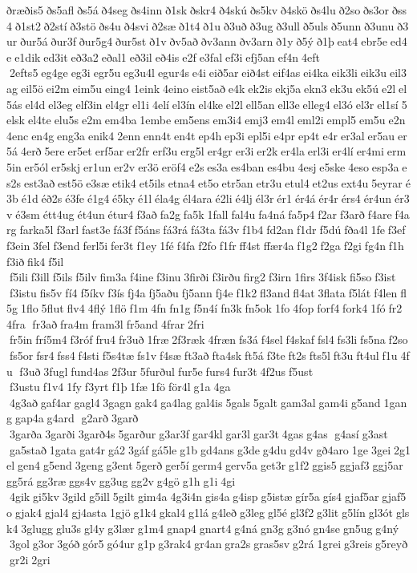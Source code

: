 ðræðis5 ðs5afl ðs5á ð4seg ðs4inn ð1sk ðskr4 ð4skú ðs5kv ð4skö ðs4lu ð2so ðs3or ðss4 ð1st2 ð2stí ð3stö ðs4u ð4svi ð2sæ ð1t4 ð1u ð3uð ð3ug ð3ull ð5uls ð5unn ð3unu ð3ur ður5á ður3f ður5g4 ður5st ð1v ðv5að ðv3ann ðv3arn ð1y ð5ý ð1þ eat4 ebr5e ed4e e1dik ed3it eð3a2 eðal1 eð3il eð4is e2f e3fal ef3i efj5an ef4n 4eft  2efts5 eg4ge eg3i egr5u eg3u4l egur4s e4i eið5ar eið4st eif4as ei4ka eik3li eik3u eil3ag eil5ö ei2m eim5u eing4 1eink 4eino eist5að e4k ek2is ekj5a ekn3 ek3u ek5ú e2l el5ás el4d el3eg elf3in el4gr el1i 4elí el3ín el4ke el2l ell5an ell3e elleg4 el3ó el3r el1sí 5elsk el4te elu5s e2m em4ba 1embe em5ens em3i4 emj3 em4l eml2i empl5 em5u e2n 4enc en4g eng3a enik4 2enn enn4t en4t ep4h ep3i epl5i e4pr ep4t e4r er3al er5au er5á 4erð 5ere er5et erf5ar er2fr erf3u erg5l er4gr er3i er2k er4la erl3i er4lí er4mi erm5in er5ól er5skj er1un er2v er3ö eröf4 e2s es3a es4ban es4bu 4esj e5ske 4eso esp3a es2s est3að est5ö e3sæ etik4 et5ils etna4 et5o etr5an etr3u etul4 et2us ext4u 5eyrar é3b é1d éð2s é3fe é1g4 é5ky é1l éla4g él4ara é2li é4lj él3r ér1 ér4á ér4r érs4 ér4un ér3v é3sm étt4ug ét4un étur4 f3að fa2g fa5k 1fall fal4u fa4ná fa5p4 f2ar f3arð f4are f4arg farka5l f3arl fast3e fá3f f5áns fá3rá fá3ta fá3v f1b4 fd2an f1dr f5dú fða4l 1fe f3ef f3ein 3fel f3end ferl5i fer3t f1ey 1fé f4fa f2fo f1fr ff4st ffær4a f1g2 f2ga f2gi fg4n f1h f3ið fik4 f5il  f5ili f3ill f5ils f5ilv fim3a f4ine f3inu 3firði f3irðu firg2 f3irn 1firs 3f4isk fi5so f3ist  f3istu fis5v fí4 f5íkv f3ís fj4a fj5aðu fj5ann fj4e f1k2 fl3and fl4at 3flata f5lát f4len fl5g 1flo 5flut flv4 4flý 1flö f1m 4fn fn1g f5n4í fn3k fn5ok 1fo 4fop forf4 fork4 1fó fr2 4fra  fr3að fra4m fram3l fr5and 4frar 2fri  fr5in frí5m4 f3róf fru4 fr3uð 1fræ 2f3ræk 4fræn fs3á f4sel f4skaf fsl4 fs3li fs5na f2so fs5or fsr4 fss4 f4sti f5s4tæ fs1v f4sæ ft3að fta4sk ft5á f3te ft2s fts5l ft3u ft4ul f1u 4fu  f3uð 3fugl fund4as 2f3ur 5furðul fur5e furs4 fur3t 4f2us f5ust  f3ustu f1v4 1fy f3yrt f1þ 1fæ 1fö för4l g1a 4ga  4g3að gaf4ar gagl4 3gagn gak4 ga4lag gal4is 5gals 5galt gam3al gam4i g5and 1gang gap4a g4ard  g2arð 3garð  3garða 3garði 3garð4s 5garður g3ar3f gar4kl gar3l gar3t 4gas g4as  g4así g3ast  ga5stað 1gata gat4r gá2 3gáf gá5le g1b gd4ans g3de g4du gd4v gð4aro 1ge 3gei 2g1el gen4 g5end 3geng g3ent 5gerð ger5í germ4 gerv5a get3r g1f2 ggis5 ggjaf3 ggj5ar gg5rá gg3ræ ggs4v gg3ug gg2v g4gö g1h g1i 4gi  4gik gi5kv 3gild g5ill 5gilt gim4a 4g3i4n gis4a g4isp g5istæ gír5a gís4 gjaf5ar gjaf5o gjak4 gjal4 gj4asta 1gjö g1k4 gkal4 g1lá g4leð g3leg gl5é gl3f2 g3lit g5lín gl3ót glsk4 3glugg glu3s gl4y g3lær g1m4 gnap4 gnart4 g4ná gn3g g3nó gn4se gn5ug g4ný  3gol g3or 3góð gór5 gó4ur g1p g3rak4 gr4an gra2s gras5sv g2rá 1grei g3reis g5reyð gr2i 2gri 
